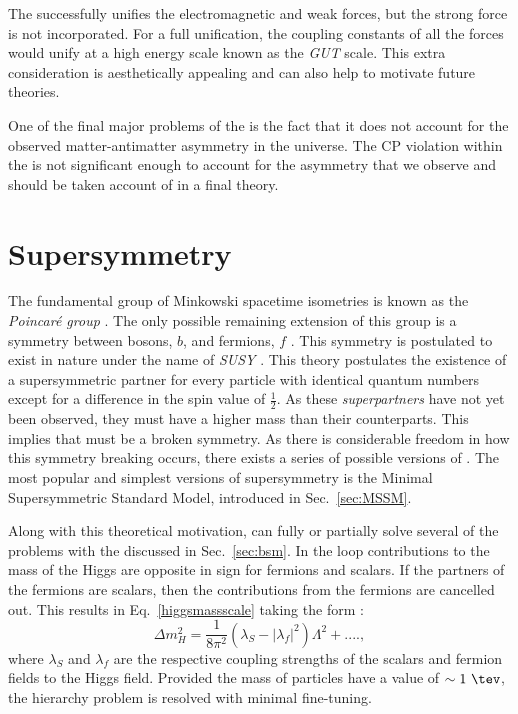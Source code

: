 The \SM successfully unifies the electromagnetic and weak forces, but
the strong force is not incorporated. For a full unification, the
coupling constants of all the \SM forces would unify at a high energy
scale known as the \emph{\acf{GUT}} scale. This extra consideration is
aesthetically appealing and can also help to motivate future \BSM
theories.

One of the final major problems of the \SM is the fact that it does
not account for the observed matter-antimatter asymmetry in the
universe. The \ac{CP} violation within the \SM is not significant
enough to account for the asymmetry that we observe and should be taken
account of in a final \BSM theory.

\section{Supersymmetry}
\label{sec:susy}

The fundamental group of Minkowski spacetime isometries is known as
the \emph{Poincar\'e group} \cite{Poincare1906}. The only possible
remaining extension of this group is a symmetry between bosons, $b$,
and fermions, $f$ \cite{PhysRev.159.1251}. This symmetry is postulated to exist in nature
under the name of \emph{\acf{SUSY}} \cite{Martin:1997ns}. This theory
postulates the existence of a supersymmetric partner for every \SM
particle with identical quantum numbers except for a difference in the
spin value of $\frac{1}{2}$. As these \emph{superpartners} have not
yet been
observed, they must have a higher mass than their \SM
counterparts. This implies that \SUSY must be a broken symmetry. As
there is considerable freedom in how this symmetry breaking occurs,
there exists a series of possible versions of \SUSY. The most popular
and simplest versions of supersymmetry is the Minimal Supersymmetric
Standard Model, introduced in
Sec.~\ref{sec:MSSM}.

Along with this theoretical motivation, \SUSY can fully or partially
solve several of the problems with the \SM discussed in
Sec.~\ref{sec:bsm}. In \SUSY the loop contributions to the mass of the
Higgs are opposite in sign for fermions and scalars. If the partners
of the \SM fermions are \SUSY scalars, then the contributions from the
\SM fermions are cancelled out. This results in Eq.~\ref{higgsmassscale} taking the
form \cite{Martin:1997ns}:
\begin{equation}
\Delta m_H^2 = \frac{1}{8\pi^2}(\lambda_S-|\lambda_f|^2)\Lambda^2+....,
\end{equation}
where $\lambda_S$ and $\lambda_f$ are the respective coupling
strengths of the scalars and fermion fields to the Higgs field.
Provided the mass of \SUSY particles have a value of $\sim1~\tev$, the
hierarchy problem is resolved with minimal fine-tuning.

